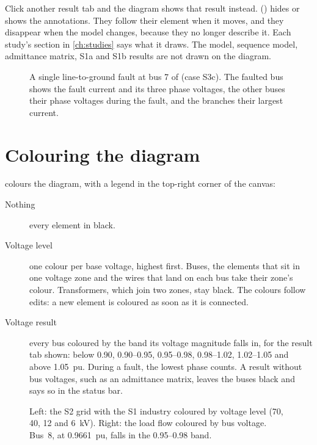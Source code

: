 Click another result tab and the diagram shows that result instead.  () hides or shows the annotations. They follow
their element when it moves, and they disappear when the model changes, because they no
longer describe it. Each study's section in \cref{ch:studies} says what it draws. The
model, sequence model, admittance matrix, S1a and S1b results are not drawn on the
diagram.

\begin{figure}[H]
  \centering{}
  \caption{A single line-to-ground fault at bus 7 of  (case
    S3c). The faulted bus shows the fault current and its three phase voltages, the other
    buses their phase voltages during the fault, and the branches their largest current.}
\end{figure}

\section{Colouring the diagram}\label{sec:colouring}

 colours the diagram, with a legend in the top-right corner of the
canvas:

\begin{description}
  \item[Nothing] every element in black.
  \item[Voltage level] one colour per base voltage, highest first. Buses, the elements that
    sit in one voltage zone and the wires that land on each bus take their zone's colour.
    Transformers, which join two zones, stay black. The colours follow edits: a new
    element is coloured as soon as it is connected.
  \item[Voltage result] every bus coloured by the band its voltage magnitude falls in, for
    the result tab shown: below 0.90, 0.90--0.95, 0.95--0.98, 0.98--1.02, 1.02--1.05 and
    above 1.05~pu. During a fault, the lowest phase counts. A result without bus
    voltages, such as an admittance matrix, leaves the buses black and says so in the
    status bar.
\end{description}

\begin{figure}[H]
  \centering
  \begin{minipage}[t]{0.49\linewidth}
    \centering{}
  \end{minipage}\hfill
  \begin{minipage}[t]{0.49\linewidth}
    \centering{}
  \end{minipage}
  \caption{Left: the S2 grid with the S1 industry coloured by voltage level (70, 40, 12
    and 6~kV). Right: the load flow coloured by bus voltage. Bus~8, at 0.9661~pu, falls in
    the 0.95--0.98 band.}
\end{figure}

